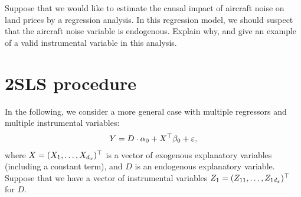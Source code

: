 \documentclass[11pt, A4paper, openany, uplatex]{book}
\begin{document}
\begin{framed}
\begin{exercise}\upshape
	Suppose that we would like to estimate the causal impact of aircraft noise on land prices by a regression analysis.
	In this regression model, we should suspect that the aircraft noise variable is endogenous. Explain why, and give an example of a valid instrumental variable in this analysis.
\end{exercise}
\end{framed}

\section{2SLS procedure}

In the following, we consider a more general case with multiple regressors and multiple instrumental variables:
\begin{align*}
	Y = D \cdot \alpha_0 + X^\top \beta_0 + \varepsilon,
\end{align*}
where $X = (X_1, \ldots , X_{d_x})^\top$ is a vector of exogenous explanatory variables (including a constant term), and $D$ is an endogenous explanatory variable.
Suppose that we have a vector of instrumental variables $Z_1 = (Z_{11}, \ldots, Z_{1d_z})^\top$ for $D$.
\end{document}
